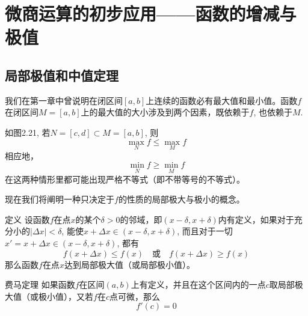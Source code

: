 \section{微商运算的初步应用——函数的增减与极值}
\subsection{局部极值和中值定理}
我们在第一章中曾说明在闭区间$[a,b]$上连续的函数必有最大值和最小值。函数$f$在闭区间$M=[a,b]$上的最大值的大小涉及到两个因素，既依赖于$f$, 也依赖于$M$.

如图2.21, 若$N=[c,d]\subset M=[a,b]$, 则
\[\max_N f\le \max_M f\]
相应地，
\[\min_N f\ge \min_M f\]
在这两种情形里都可能出现严格不等式（即不带等号的不等式）。

\begin{figure}[htp]
    \centering
    \caption{}
\end{figure}

现在我们将阐明一种只决定于$f$的性质的局部极大与极小的概念。

\begin{blk}
    {定义} 设函数$f$在点$x$的某个$\delta>0$的邻域，即$(x-\delta,x+\delta)$内有定义，如果对于充分小的$|\Delta x|<\delta$, 能使$x+\Delta x\in (x-\delta,x+\delta)$, 而且对于一切$x'=x+\Delta x\in (x-\delta,x+\delta)$, 都有
\[f(x+\Delta x)\le f(x)\quad \text{或}\quad f(x+\Delta x)\ge f(x)\]
那么函数$f$在点$x$达到局部极大值（或局部极小值）。
\end{blk}

\begin{blk}
    {费马定理} 如果函数$f$在区间$(a,b)$上有定义，并且在这个区间内的一点$c$取局部极大值（或极小值），又若$f$在$c$点可微，那么
    \[f' (c) =0\]
\end{blk}

